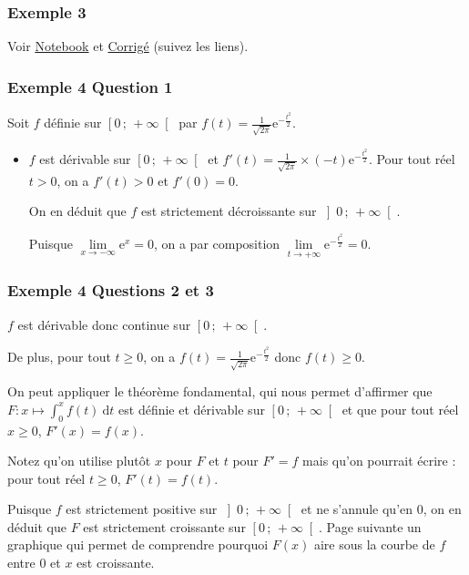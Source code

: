 \documentclass[11pt, hyperref={urlcolor=red,%
            linkcolor=blue, %
            colorlinks=true}]{beamer}
\newcommand{\Interoo}[2]{\left]#1\, ;\, #2\right[}
\newcommand{\Interfo}[2]{\left[#1\, ;\, #2\right[}
\newcommand{\dt}{\ensuremath{\text{d}t}}		%
\newcommand{\integralet}[3]{\int_{#1}^{#2} #3 \ \dt}
\begin{document}
\begin{frame}
\frametitle{Exemple 3}

Voir \href{https://mybinder.org/v2/gh/frederic-junier/TS-2019-2020/master?filepath=CalculIntegral/ressources/Cours_Calcul_Integral_2020_Eleve.ipynb}{Notebook} et  \href{https://frederic-junier.github.io/TS-2019-2020/CalculIntegral/ressources/Cours_Calcul_Integral_2020_Eleve-Corrige.pdf}{Corrigé} (suivez les liens).


\end{frame}



\begin{frame}
\frametitle{Exemple 4 Question 1}

Soit $f$ définie sur $\Interfo{0}{+\infty}$ par $f(t)=\frac{1}{\sqrt{2\pi}}\text{e}^{-\frac{t^2}{2}}$.

\begin{itemize}

\item $f$ est dérivable sur  $\Interfo{0}{+\infty}$ et $f'(t)=\frac{1}{\sqrt{2\pi}} \times (-t)\text{e}^{-\frac{t^2}{2}}$. Pour  tout réel $t>0$, on a $f'(t)>0$ et $f'(0)=0$.

On en déduit que $f$ est  strictement décroissante sur $\Interoo{0}{+\infty}$.

Puisque $\lim\limits_{x \to -\infty} \text{e}^{x}=0$, on a par composition $\lim\limits_{t \to +\infty} \text{e}^{-\frac{t^2}{2}}=0$.


\end{itemize}


\end{frame}



\begin{frame}
\frametitle{Exemple 4 Questions 2 et 3}

$f$ est dérivable donc continue  sur $\Interfo{0}{+\infty}$.

De plus, pour tout $t \geqslant 0$, on a  $f(t)=\frac{1}{\sqrt{2\pi}}\text{e}^{-\frac{t^2}{2}}$ donc $f(t) \geqslant 0$.

On peut appliquer le théorème fondamental, qui nous permet d'affirmer que  $F:x \mapsto \integralet{0}{x}{f(t)}$ est définie et dérivable sur $\Interfo{0}{+\infty}$  et que pour tout réel $x \geqslant 0$, $F'(x)=f(x)$.

Notez qu'on utilise plutôt $x$ pour $F$ et $t$ pour $F'=f$ mais qu'on pourrait écrire : pour tout réel $t \geqslant 0$, $F'(t)=f(t)$.

Puisque $f$ est strictement positive sur $\Interoo{0}{+\infty}$ et ne s'annule qu'en 0, on en déduit que $F$ est strictement croissante sur $\Interfo{0}{+\infty}$. Page suivante un graphique qui permet de comprendre pourquoi $F(x)$ aire sous la courbe de $f$ entre $0$ et $x$ est croissante.


\end{frame}
\end{document}
